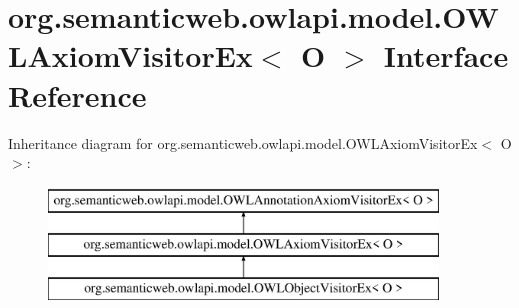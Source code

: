 \hypertarget{interfaceorg_1_1semanticweb_1_1owlapi_1_1model_1_1_o_w_l_axiom_visitor_ex_3_01_o_01_4}{\section{org.\-semanticweb.\-owlapi.\-model.\-O\-W\-L\-Axiom\-Visitor\-Ex$<$ O $>$ Interface Reference}
\label{interfaceorg_1_1semanticweb_1_1owlapi_1_1model_1_1_o_w_l_axiom_visitor_ex_3_01_o_01_4}
}
Inheritance diagram for org.\-semanticweb.\-owlapi.\-model.\-O\-W\-L\-Axiom\-Visitor\-Ex$<$ O $>$\-:\begin{figure}[H]
\begin{center}
\leavevmode
\includegraphics[height=3.000000cm]{interfaceorg_1_1semanticweb_1_1owlapi_1_1model_1_1_o_w_l_axiom_visitor_ex_3_01_o_01_4}
\end{center}
\end{figure}
